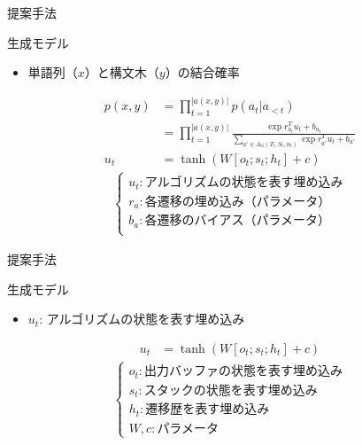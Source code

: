 \documentclass[aspectratio=43,unicode,10pt]{beamer}
\begin{document}
\begin{frame}{提案手法}
  \begin{block}{生成モデル}
    \begin{itemize}
      \item 単語列（$x$）と構文木（$y$）の結合確率
    \end{itemize}
    \begin{align*}
      p(x, y) & = \prod_{t=1}^{|a(x, y)|} p(a_t | a_{<t}) \\
              & = \prod_{t=1}^{|a(x, y)|}
                  \frac{\exp r_{a_t}^T u_t + b_{a_t}}
                      {\sum_{a' \in A_G(T_t, S_t, n_t)}
                        \exp r_{a'}^T u_t + b_{a'}} \\
      u_t & = \tanh (W[o_t; s_t; h_t] + c)
    \end{align*}
    \begin{gather*}
      \begin{cases}
        u_t: \text{アルゴリズムの状態を表す埋め込み} \\
        r_a: \text{各遷移の埋め込み（パラメータ）} \\
        b_a: \text{各遷移のバイアス（パラメータ）} \\
      \end{cases}
    \end{gather*}
  \end{block}
\end{frame}

\begin{frame}{提案手法}
  \begin{block}{生成モデル}
    \begin{itemize}
      \item $u_t$: アルゴリズムの状態を表す埋め込み
    \end{itemize}
    \begin{align*}
      u_t & = \tanh (W[o_t; s_t; h_t] + c)
    \end{align*}
    \begin{gather*}
      \begin{cases}
        o_t: \text{出力バッファの状態を表す埋め込み} \\
        s_t: \text{スタックの状態を表す埋め込み} \\
        h_t: \text{遷移歴を表す埋め込み} \\
        W, c: \text{パラメータ}
      \end{cases}
    \end{gather*}
  \end{block}
\end{frame}
\end{document}
